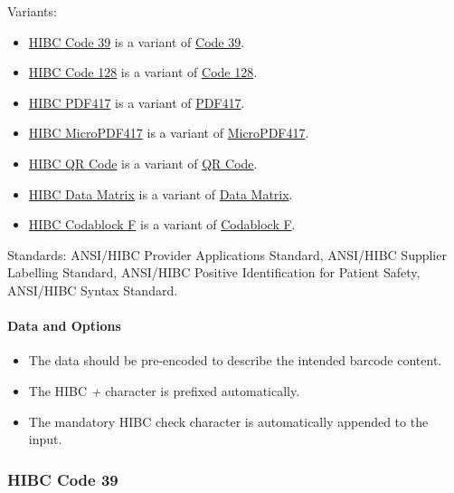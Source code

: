 Variants:

\begin{itemize}
\tightlist
\item
  \protect\hyperlink{hibc-code-39}{HIBC Code 39} is a variant of
  \protect\hyperlink{code-39}{Code 39}.
\item
  \protect\hyperlink{hibc-code-128}{HIBC Code 128} is a variant of
  \protect\hyperlink{code-128}{Code 128}.
\item
  \protect\hyperlink{hibc-pdf417}{HIBC PDF417} is a variant of
  \protect\hyperlink{pdf417}{PDF417}.
\item
  \protect\hyperlink{hibc-micropdf417}{HIBC MicroPDF417} is a variant of
  \protect\hyperlink{micropdf417}{MicroPDF417}.
\item
  \protect\hyperlink{hibc-qr-code}{HIBC QR Code} is a variant of
  \protect\hyperlink{qr-code}{QR Code}.
\item
  \protect\hyperlink{hibc-data-matrix}{HIBC Data Matrix} is a variant of
  \protect\hyperlink{data-matrix}{Data Matrix}.
\item
  \protect\hyperlink{hibc-codablock-f}{HIBC Codablock F} is a variant of
  \protect\hyperlink{codablock-f}{Codablock F}.
\end{itemize}

Standards: ANSI/HIBC Provider Applications Standard, ANSI/HIBC Supplier
Labelling Standard, ANSI/HIBC Positive Identification for Patient
Safety, ANSI/HIBC Syntax Standard.

\hypertarget{data-and-options-58}{%
\paragraph{Data and Options}\label{data-and-options-58}}

\begin{itemize}
\tightlist
\item
  The data should be pre-encoded to describe the intended barcode
  content.
\item
  The HIBC \emph{+} character is prefixed automatically.
\item
  The mandatory HIBC check character is automatically appended to the
  input.
\end{itemize}

\hypertarget{hibc-code-39}{%
\subsubsection{HIBC Code 39}\label{hibc-code-39}}

